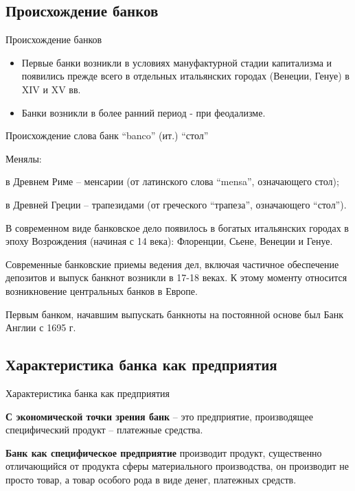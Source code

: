\documentclass[_Banking_p1.tex]{subfiles}
\begin{document}

\subsection{Происхождение банков}
\begin{frame}{Происхождение банков}{}
\begin{itemize}[<+->]
\item
Первые банки возникли в условиях ману­фактурной стадии капитализма и появились прежде всего в отдельных итальянских городах (Венеции, Генуе) в XIV и XV вв. 
\item
Банки возникли в более ран­ний период - при феодализме. 
\end{itemize}
\end{frame}

\begin{frame}{Происхождение слова банк}
``banco'' (ит.) ``стол''

Менялы: 

в Древнем Риме – менсарии (от латинского слова ``mensa'', означающего стол);

в Древней Греции – трапезидами  (от греческого ``трапеза'', означающего ``стол'').

\end{frame}
\begin{frame}
В современном виде банковское дело появилось в богатых итальянских городах в эпоху Возрождения (начиная с 14 века): Флоренции, Сьене, Венеции и Генуе.

Современные банковские приемы ведения дел, включая частичное обеспечение депозитов и выпуск банкнот возникли в 17-18 веках. К этому моменту относится возникновение центральных банков в Европе.

Первым банком, начавшим выпускать банкноты на постоянной основе был Банк Англии с 1695 г.

\end{frame}

\subsection{Характеристика банка как предприятия}
\begin{frame}{Характеристика банка как предприятия}{}
\begin{block}{\textbf{С экономической точки зрения банк }}
\quad
– это предприятие, производящее специфический продукт – платежные средства.
\end{block}

\begin{block}{\textbf{Банк как специфическое предприятие }}
\quad
производит продукт, существенно отличающийся от продукта сферы материального производства, он производит не просто товар, а товар особого рода в виде денег, платежных средств.
\end{block}

\end{frame}
\end{document}
